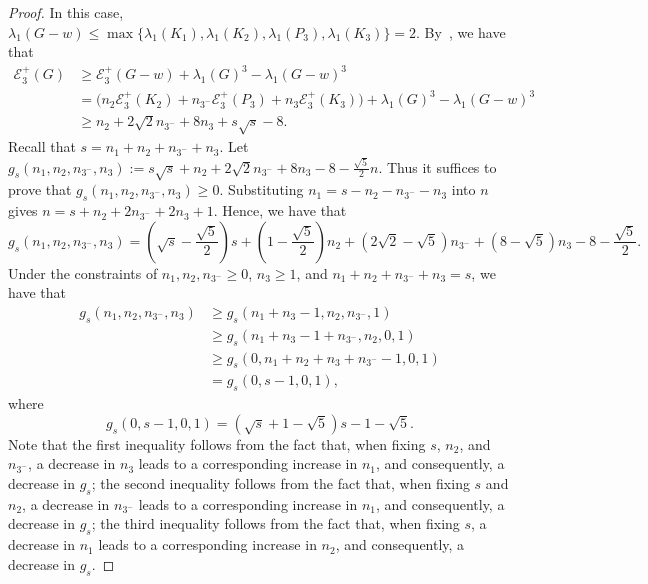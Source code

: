 \documentclass[a4paper,12pt]{article}
\theoremstyle{plain}
\begin{document}
\begin{proof}
In this case, $\lambda_1(G-w)\leq \max\{\lambda_1(K_1),\lambda_1(K_2),\lambda_1(P_3),\lambda_1(K_3)\}=2$. 
By~, we have that
\[
\begin{aligned}
\mathcal{E}^+_3(G) 
&\ge \mathcal{E}^+_3(G-w) + \lambda_1(G)^3 - \lambda_1(G-w)^3 \\
&=\big(n_2 \mathcal{E}^+_3(K_2)+n_{3^-} \mathcal{E}^+_3(P_3)+n_3 \mathcal{E}^+_3(K_3) \big)+\lambda_1(G)^3-\lambda_1(G-w)^3 \\
&\ge n_2+2\sqrt{2}n_{3^-}+8n_3+s\sqrt{s}-8.
\end{aligned}
\]
Recall that $s = n_1 + n_2 + n_{3^-} + n_3$. Let
$g_s(n_1,n_2,n_{3^-},n_3):= s\sqrt{s} + n_2 + 2\sqrt{2} n_{3^-} + 8 n_3 - 8 - \frac{\sqrt{5}}{2} n$. Thus it suffices to prove that $g_s(n_1,n_2,n_{3^-},n_3)\geq 0$. Substituting $n_1 = s - n_2 - n_{3^-} - n_3$ into $n$ gives $n = s + n_2 + 2 n_{3^-} + 2 n_3 + 1.$ Hence, we have that $$g_s(n_1,n_2,n_{3^-},n_3)=(\sqrt{s} - \frac{\sqrt{5}}{2})s + (1- \frac{\sqrt{5}}{2}) n_2 + (2\sqrt{2}-\sqrt{5}) n_{3^-} + \left(8 - \sqrt{5}\right) n_3 - 8 - \frac{\sqrt{5}}{2}.$$ Under the constraints of $n_1,n_2,n_{3^-} \ge 0$, $n_3\geq 1$, and $n_1+n_2+n_{3^-}+n_3=s$, we have that
$$
\begin{aligned}
g_s(n_1, n_2, n_{3^-},n_3)
&\geq g_s(n_1+n_3-1, n_2,n_{3^-},1 )\\
&\geq g_s(n_1+n_3-1+n_{3^-}, n_2,0,1 )\\
&\geq g_s(0, n_1+n_2+n_3+n_{3^-}-1,0,1 )\\
&= g_s(0, s-1, 0, 1),
\end{aligned}
$$
where
$$
g_s(0, s-1, 0, 1) =(\sqrt{s}+1-\sqrt{5})s - 1 - \sqrt{5}.
$$ Note that the first inequality follows from the fact that, when fixing $s$, $n_2$, and $n_{3^-}$, a decrease in $n_3$ leads to a corresponding increase in $n_1$, and consequently, a decrease in $g_s$; the second inequality follows from the fact that, when fixing $s$ and $n_2$, a decrease in $n_{3^-}$ leads to a corresponding increase in $n_1$, and consequently, a decrease in $g_s$; the third inequality follows from the fact that, when fixing $s$, a decrease in $n_1$ leads to a corresponding increase in $n_2$, and consequently, a decrease in $g_s$.



\end{proof}
\end{document}
